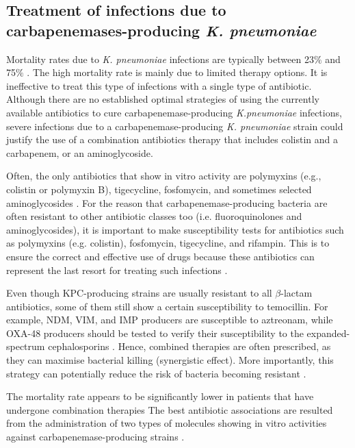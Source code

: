 \documentclass[11pt]{report}
\begin{document}
\subsection{Treatment of infections due to carbapenemases-producing \emph{K. pneumoniae}}
Mortality rates due to \emph{K. pneumoniae} infections are typically between 23$\%$ and 75$\%$ \cite{karaiskos2014multidrug}.
The high mortality rate is mainly due to limited therapy options. It is ineffective to treat this type of infections with a single type of antibiotic. Although there are no established optimal strategies of using the currently available antibiotics to cure carbapenemase-producing \emph{K.pneumoniae} infections, severe infections due to a carbapenemase-producing \emph{K. pneumoniae} strain could justify the use of a combination antibiotics therapy that includes colistin and a carbapenem, or an aminoglycoside.

Often, the only antibiotics that show in vitro activity are polymyxins (e.g., colistin or polymyxin B), tigecycline, fosfomycin, and sometimes selected aminoglycosides \cite{rodriguez2015diagnosis}.
For the reason that carbapenemase-producing bacteria are often resistant to other antibiotic classes too (i.e. fluoroquinolones and aminoglycosides), it is important to make susceptibility tests for antibiotics such as polymyxins (e.g. colistin), fosfomycin, tigecycline, and rifampin.
This is to ensure the correct and effective use of drugs because these antibiotics can represent the last resort for treating such infections \cite{adams2009activity}.

Even though KPC-producing strains are usually resistant to all $\beta$-lactam antibiotics, some of them still show a certain susceptibility to temocillin.
For example, NDM, VIM, and IMP producers are susceptible to aztreonam, while OXA-48 producers should be tested to verify their susceptibility to the expanded-spectrum cephalosporins \cite{girlich2009ctx}.
Hence, combined therapies are often prescribed, as they can maximise bacterial killing (synergistic effect).
More importantly, this strategy can potentially reduce the risk of bacteria becoming resistant \cite{Pitout2015}.

The mortality rate appears to be significantly lower in patients that have undergone combination therapies \cite{tzouvelekis2014treating, zavascki2013combination}
The best antibiotic associations are resulted from the administration of two types of molecules showing in vitro activities against carbapenemase-producing strains \cite{falagas2013antibiotic, tzouvelekis2014treating}.
\end{document}
